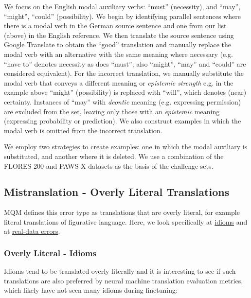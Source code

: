 \documentclass[11pt]{article}
\begin{document}
We focus on the English modal auxiliary verbs: ``must'' (necessity), and ``may'', ``might'', ``could'' (possibility). We begin by identifying parallel sentences where there is a modal verb in the German source sentence and one from our list (above) in the English reference. We then translate the source sentence using Google Translate to obtain the ``good'' translation and manually replace the modal verb with an alternative with the same meaning where necessary (e.g. ``have to'' denotes necessity as does ``must''; also ``might'', ``may'' and ``could'' are considered equivalent). For the incorrect translation, we manually substitute the modal verb that conveys a different meaning or \textit{epistemic strength} e.g. in the example above ``might'' (possibility) is replaced with ``will'', which denotes (near) certainty. Instances of ``may'' with \textit{deontic} meaning (e.g. expressing permission) are excluded from the set, leaving only those with an \textit{epistemic} meaning (expressing probability or prediction). We also construct examples in which the modal verb is omitted from the incorrect translation.

We employ two strategies to create examples: one in which the modal auxiliary is substituted, and another where it is deleted. We use a combination of the FLORES-200 and PAWS-X datasets as the basis of the challenge sets.


\subsection{Mistranslation - Overly Literal Translations}

MQM defines this error type as translations that are overly literal, for example literal translations of figurative language. Here, we look specifically at \hyperref[subsec:idioms]{idioms} and at \hyperref[subsec:real_overly_literal]{real-data errors}.

\subsubsection{Overly Literal - Idioms}
\label{subsec:idioms}
Idioms tend to be translated overly literally \citep{dankers-etal-2022-transformer} and it is interesting to see if such translations are also preferred by neural machine translation evaluation metrics, which likely have not seen many idioms during finetuning:
\end{document}
